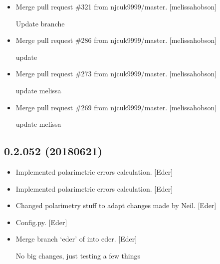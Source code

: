 \documentclass[a4paper,10pt,english]{report}
\begin{document}
\begin{itemize}
\item {} 
Merge pull request \#321 from njcuk9999/master. {[}melissa\sphinxhyphen{}hobson{]}

Update branche

\item {} 
Merge pull request \#286 from njcuk9999/master. {[}melissa\sphinxhyphen{}hobson{]}

update

\item {} 
Merge pull request \#273 from njcuk9999/master. {[}melissa\sphinxhyphen{}hobson{]}

update melissa

\item {} 
Merge pull request \#269 from njcuk9999/master. {[}melissa\sphinxhyphen{}hobson{]}

update melissa

\end{itemize}


\subsection{0.2.052 (2018\sphinxhyphen{}06\sphinxhyphen{}21)}
\label{\detokenize{misc/changelog:id433}}\begin{itemize}
\item {} 
Implemented polarimetric errors calculation. {[}Eder{]}

\item {} 
Implemented polarimetric errors calculation. {[}Eder{]}

\item {} 
Changed polarimetry stuff to adapt changes made by Neil. {[}Eder{]}

\item {} 
Config.py. {[}Eder{]}

\item {} 
Merge branch ‘eder’ of  into
eder. {[}Eder{]}

No big changes, just testing a few things

\end{itemize}
\end{document}
